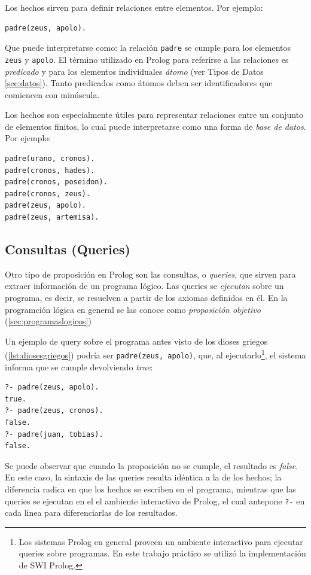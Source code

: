 \documentclass[12pt,titlepage]{article}
\begin{document}
Los hechos sirven para definir relaciones entre elementos. Por ejemplo:
\begin{lstlisting}
padre(zeus, apolo).
\end{lstlisting}
Que puede interpretarse como: la relación \lstinline|padre| se cumple para los elementos \lstinline|zeus| y \lstinline|apolo|. El término utilizado en Prolog para referirse a las relaciones es \emph{predicado} y para los elementos individuales \emph{átomo} (ver Tipos de Datos \ref{sec:datos}). Tanto predicados como átomos deben ser identificadores que comiencen con minúscula.

Los hechos son especialmente útiles para representar relaciones entre un conjunto de elementos finitos, lo cual puede interpretarse como una forma de \emph{base de datos}. Por ejemplo:
\begin{lstlisting}[label=lst:diosesgriegos]
padre(urano, cronos).
padre(cronos, hades).
padre(cronos, poseidon).
padre(cronos, zeus).
padre(zeus, apolo).
padre(zeus, artemisa).
\end{lstlisting}

\subsection{Consultas (Queries)}

Otro tipo de proposición en Prolog son las consultas, o \emph{queries}, que sirven para extraer información de un programa lógico. Las queries se \emph{ejecutan} sobre un programa, es decir, se resuelven a partir de los axiomas definidos en él. En la programción lógica en general se las conoce como \emph{proposición objetivo} (\ref{sec:programaslogicos})

Un ejemplo de query sobre el programa antes visto de los dioses griegos (\ref{lst:diosesgriegos}) podría ser \lstinline|padre(zeus, apolo)|, que, al ejecutarlo\footnote{Los sistemas Prolog en general proveen un ambiente interactivo para ejecutar queries sobre programas. En este trabajo práctico se utilizó la implementación de SWI Prolog.}, el sistema informa que se cumple devolviendo \emph{true}:
\begin{lstlisting}
?- padre(zeus, apolo).
true.
?- padre(zeus, cronos).
false.
?- padre(juan, tobias).
false.
\end{lstlisting}

Se puede observar que cuando la proposición no se cumple, el resultado es \emph{false}. En este caso, la sintaxis de las queries resulta idéntica a la de los hechos; la diferencia radica en que los hechos se escriben en el programa, mientras que las queries se ejecutan en el el ambiente interactivo de Prolog, el cual antepone \lstinline|?-| en cada linea para diferenciarlas de los resultados.
\end{document}
